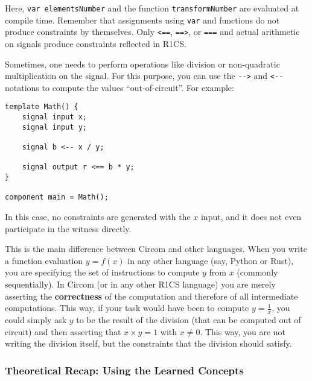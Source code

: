 \documentclass[../lecture-notes.tex]{subfiles}
\begin{document}
    Here, \texttt{var elementsNumber} and the function \texttt{transformNumber}
    are evaluated at compile time. Remember that assignments using \texttt{var} and
    functions do not produce constraints by themselves. Only \texttt{<==},
    \texttt{==>}, or \texttt{===} and actual arithmetic on signals produce
    constraints reflected in R1CS.

    \begin{remark}
        Sometimes, one needs to perform operations like division or non-quadratic multiplication on the signal.
        For this purpose, you can use the \texttt{{-}->} and \texttt{<-{-}} notations to compute the values ``out-of-circuit''. For example:

        \begin{lstlisting}[language=Circom,numbers=none]
template Math() {
    signal input x;
    signal input y;

    signal b <-- x / y;

    signal output r <== b * y;
}

component main = Math();
        \end{lstlisting}

        In this case, no constraints are generated with the $x$ input, and it does not even participate in the witness directly.
    \end{remark}

    \begin{remark}
        This is the main difference between Circom and other languages. When you 
        write a function evaluation $y = f(x)$ in any other language (say, Python or Rust),
        you are specifying the set of instructions to compute $y$ from $x$ (commonly 
        sequentially). In Circom (or in any other R1CS language) you are merely asserting 
        the \textbf{correctness} of the computation and therefore of all 
        intermediate computations. This way, if your task would have been to compute 
        $y = \frac{1}{x}$, you could simply ask $y$ to be the result of the division
        (that can be computed out of circuit) and then asserting that $x \times y = 1$
        with $x \neq 0$. This way, you are not writing the division itself, but
        the constraints that the division should satisfy.
    \end{remark}

    \subsubsection{Theoretical Recap: Using the Learned Concepts}
\end{document}

